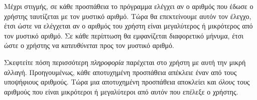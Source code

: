 \documentclass[a4paper,11pt,oneside]{book}
\begin{document}
Μέχρι στιγμής, σε κάθε προσπάθεια το πρόγραμμα ελέγχει αν ο αριθμός που έδωσε ο χρήστης ταυτίζεται με τον μυστικό αριθμό. Τώρα θα επεκτείνουμε αυτόν τον έλεγχο, έτσι ώστε να ελέγχεται αν ο αριθμός του χρήστη είναι μεγαλύτερος ή μικρότερος από τον μυστικό αριθμό. Σε κάθε περίπτωση θα εμφανίζεται διαφορετικό μήνυμα, έτσι ώστε ο χρήστης να \emph{κατευθύνεται} προς τον μυστικό αριθμό.


Σκεφτείτε πόση περισσότερη \emph{πληροφορία} παρέχεται στο χρήστη με αυτή την μικρή αλλαγή. 
Προηγουμένως, κάθε αποτυχημένη προσπάθεια απέκλειε έναν από τους υποψήφιους αριθμούς. Τώρα μια αποτυχημένη προσπάθεια αποκλείει και \emph{όλους} τους αριθμούς που είναι μικρότεροι ή μεγαλύτεροι από αυτόν που επέλεξε ο χρήστης. 


\end{document}
